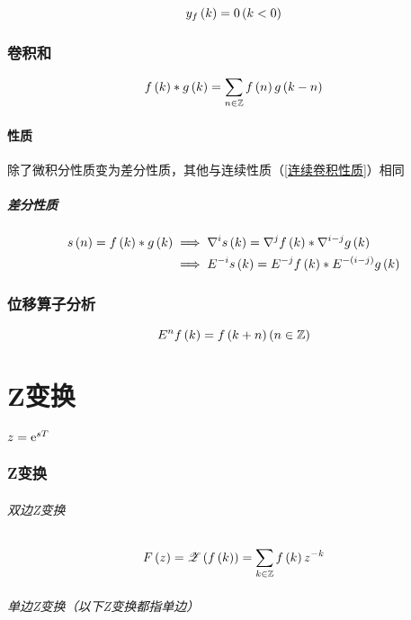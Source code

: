 \documentclass{article}
\begin{document}
\[y_f\left(k\right)=0\left(k<0\right)\]

\section{卷积和}

\[f\left(k\right)\ast g\left(k\right)=\sum_{n\in\mathbb Z} f\left(n\right)g\left(k-n\right)\]

\subsection{性质}

除了微积分性质变为差分性质，其他与连续性质（\ref{连续卷积性质}）相同

\subsubsection{差分性质}

\[\begin{aligned}
        s\left(n\right)=f\left(k\right)\ast g\left(k\right) & \implies\nabla^is\left(k\right)=\nabla^jf\left(k\right)\ast\nabla^{i-j}g\left(k\right)  \\
                                          & \implies E^{-i}s\left(k\right)=E^{-j}f\left(k\right)\ast E^{-\left(i-j\right)}g\left(k\right)
    \end{aligned}\]

\section{位移算子分析}

\[E^nf\left(k\right)=f\left(k+n\right)\left(n\in\mathbb Z\right)\]

\part{Z变换}

$z=\mathrm e^{sT}$

\section{Z变换}

\paragraph{双边Z变换}

\[F\left(z\right)=\mathscr Z\left(f\left(k\right)\right)=\sum_{k\in\mathbb Z}f\left(k\right) z^{-k}\]

\paragraph{单边Z变换（以下Z变换都指单边）}
\end{document}
